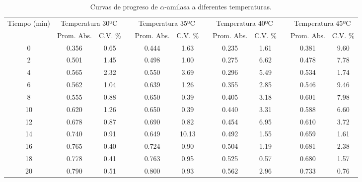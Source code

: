 \documentclass{article}
\begin{document}
\begin{table}[H]
	\centering
	
	\caption{Curvas de progreso de $\alpha$-amilasa a diferentes temperaturas.}
	\begin{adjustbox}{width=\textwidth}
	\begin{tabular}{cccccccccccc}
		\toprule
		\multirow{2}[4]{*}{Tiempo (min)} & \multicolumn{2}{c}{Temperatura 30ºC} &       & \multicolumn{2}{c}{Temperatura 35ºC} &       & \multicolumn{2}{c}{Temperatura 40ºC} &       & \multicolumn{2}{c}{Temperatura 45ºC} \\
		\cmidrule{2-12}          & Prom. Abs. & C.V. \% &       & Prom. Abs. & C.V. \% &       & Prom. Abs. & C.V. \% &       & Prom. Abs. & C.V. \% \\
		\midrule
		0     & 0.356 & 0.65  &       & 0.444 & 1.63  &       & 0.235 & 1.61  &       & 0.381 & 9.60 \\
		2     & 0.501 & 1.45  &       & 0.498 & 1.00  &       & 0.275 & 6.62  &       & 0.478 & 7.78 \\
		4     & 0.565 & 2.32  &       & 0.550 & 3.69  &       & 0.296 & 5.49  &       & 0.534 & 1.74 \\
		6     & 0.562 & 1.04  &       & 0.639 & 1.26  &       & 0.355 & 2.85  &       & 0.546 & 9.46 \\
		8     & 0.555 & 0.88  &       & 0.650 & 0.39  &       & 0.405 & 3.18  &       & 0.601 & 7.98 \\
		10    & 0.620 & 1.26  &       & 0.650 & 0.39  &       & 0.440 & 3.31  &       & 0.588 & 6.60 \\
		12    & 0.678 & 0.87  &       & 0.690 & 0.82  &       & 0.454 & 6.95  &       & 0.610 & 3.72 \\
		14    & 0.740 & 0.91  &       & 0.649 & 10.13 &       & 0.492 & 1.55  &       & 0.659 & 1.61 \\
		16    & 0.765 & 0.40  &       & 0.724 & 0.90  &       & 0.504 & 1.19  &       & 0.681 & 2.38 \\
		18    & 0.778 & 0.41  &       & 0.763 & 0.95  &       & 0.525 & 0.57  &       & 0.680 & 1.57 \\
		20    & 0.790 & 0.51  &       & 0.800 & 0.93  &       & 0.562 & 2.96  &       & 0.733 & 0.76 \\
		\bottomrule
	\end{tabular}%
	\end{adjustbox}
	\label{tab:a2}%
\end{table}%
\end{document}

